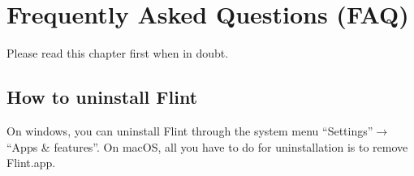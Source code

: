\documentclass[a4paper,10pt]{report}
\begin{document}

\chapter{Frequently Asked Questions (FAQ)}
Please read this chapter first when in doubt.

\section{How to uninstall Flint}
On windows, you can uninstall Flint through the system menu ``Settings''$\rightarrow$``Apps \& features''.
On macOS, all you have to do for uninstallation is to remove Flint.app.




\end{document}
